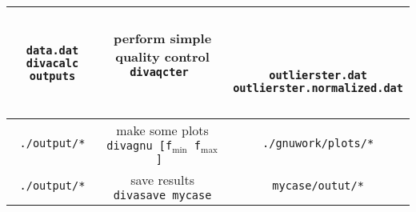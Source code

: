 \begin{table}
{{\begin{tabular}{c|c|c}
{ {\tt data.dat} \\
{\tt divacalc outputs}
}
 & 
\shortstack{
{  { }  } \\
{\sf perform simple quality control} \\
{\tt divaqcter } 
\\
{  { }  } \\
{  { }  } \\
{  { }  }
}
& 
\shortstack{
{  { }  } \\
{  { }  } \\
{  { }  } \\
{{\tt outlierster.dat}} \\
{{\tt outlierster.normalized.dat}} \\
{  { }  } \\
{  { }  } 
} \\ \hline
{\tt ./output/*}  & 
\shortstack{
{\sf make some plots} \\
{\tt divagnu [f$_{\min}$ f$_{\max}$] } 
} & {\tt ./gnuwork/plots/*} \\ \hline
{\tt ./output/*}  & 
\shortstack{
{\sf save results} \\
{\tt divasave mycase} 
}
& {\tt mycase/outut/*} \\ 
\bottomrule
\end{tabular}

}}
\end{table}


\pagebreak
\clearpage
\pagebreak


